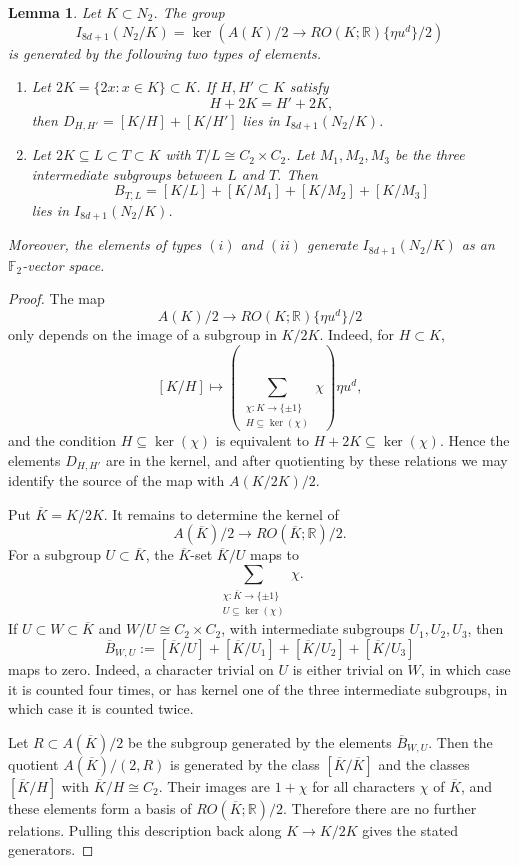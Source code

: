 \documentclass{amsart}
\theoremstyle{plain}
\newtheorem{lemma}[theorem]{Lemma}
\theoremstyle{definition}
\theoremstyle{remark}
\begin{document}
\begin{lemma}\label{lem:I-8d-plus-1-generators}
Let $K\subset N_2$.  The group
\[
I_{8d+1}(N_2/K) = \ker\left( A(K)/2 \longrightarrow RO(K;\mathbb R)\{\eta u^d\}/2 \right)
\]
is generated by the following two types of elements.

\begin{enumerate}
\item[(i)] Let $2K=\{2x:x\in K\}\subset K$. If $H,H'\subset K$ satisfy
\[
H+2K=H'+2K,
\]
then $D_{H,H'}=[K/H]+[K/H']$ lies in $I_{8d+1}(N_2/K)$.

\item[(ii)] Let $ 2K\subseteq L\subset T\subset K$ with $T/L\cong C_2\times C_2$.
Let $M_1,M_2,M_3$ be the three intermediate subgroups between $L$ and
$T$.  Then
\[
B_{T,L} = [K/L]+[K/M_1]+[K/M_2]+[K/M_3]
\]
lies in $I_{8d+1}(N_2/K)$.
\end{enumerate}
Moreover, the elements of types $(i)$ and $(ii)$ generate
$I_{8d+1}(N_2/K)$ as an $\mathbb F_2$-vector space.
\end{lemma}

\begin{proof}
The map
\[
A(K)/2\longrightarrow RO(K;\mathbb R)\{\eta u^d\}/2
\]
only depends on the image of a subgroup in $K/2K$.  Indeed, for
$H\subset K$,
\[
[K/H]\longmapsto
\left(
\sum_{\substack{\chi:K\to\{\pm1\}\\ H\subseteq \ker(\chi)}}\chi
\right)\eta u^d,
\]
and the condition $H\subseteq \ker(\chi)$ is equivalent to
$H+2K\subseteq \ker(\chi)$.  Hence the elements $D_{H,H'}$ are in the
kernel, and after quotienting by these relations we may identify the
source of the map with $A(K/2K)/2$.

Put $\overline{K}=K/2K$.  It remains to determine the kernel of
\[
A(\overline{K})/2 \longrightarrow RO(\overline{K};\mathbb{R})/2.
\]
For a subgroup $U\subset \overline{K}$, the $\overline{K}$-set
$\overline{K}/U$ maps to
\[
\sum_{\substack{\chi:\overline{K}\to\{\pm1\}\\ U\subseteq\ker(\chi)}}\chi.
\]
If $U\subset W\subset \overline{K}$ and $W/U\cong C_2\times C_2$, with
intermediate subgroups $U_1,U_2,U_3$, then
\[
\overline{B}_{W,U}:=[\overline{K}/U]+[\overline{K}/U_1]+[\overline{K}/U_2]+[\overline{K}/U_3]
\]
maps to zero.  Indeed, a character trivial on $U$ is either trivial on
$W$, in which case it is counted four times, or has kernel one of the
three intermediate subgroups, in which case it is counted twice.

Let $R\subset A(\overline K)/2$ be the subgroup generated by the elements $\overline{B}_{W,U}$. Then the quotient $A(\overline K)/(2,R)$ is generated by the class $[\overline K/\overline K]$ and the classes $[\overline K/H]$ with $\overline K/H\cong C_2$. Their images are $1+\chi$ for all characters $\chi$ of $\overline K$, and these elements form a basis of $RO(\overline K;\mathbb R)/2$. Therefore there are no further relations. Pulling this description back along $K\to K/2K$ gives the stated generators.
\end{proof}
\end{document}
